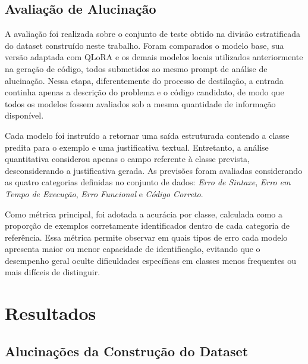 \documentclass[conference]{IEEEtran}
\begin{document}
\subsection{Avaliação de Alucinação}

A avaliação foi realizada sobre o conjunto de teste obtido na divisão estratificada do dataset construído neste trabalho. Foram comparados o modelo base, sua versão adaptada com QLoRA e os demais modelos locais utilizados anteriormente na geração de código, todos submetidos ao mesmo prompt de análise de alucinação. Nessa etapa, diferentemente do processo de destilação, a entrada continha apenas a descrição do problema e o código candidato, de modo que todos os modelos fossem avaliados sob a mesma quantidade de informação disponível.

Cada modelo foi instruído a retornar uma saída estruturada contendo a classe predita para o exemplo e uma justificativa textual. Entretanto, a análise quantitativa considerou apenas o campo referente à classe prevista, desconsiderando a justificativa gerada. As previsões foram avaliadas considerando as quatro categorias definidas no conjunto de dados: \emph{Erro de Sintaxe}, \emph{Erro em Tempo de Execução}, \emph{Erro Funcional} e \emph{Código Correto}.

Como métrica principal, foi adotada a acurácia por classe, calculada como a proporção de exemplos corretamente identificados dentro de cada categoria de referência. Essa métrica permite observar em quais tipos de erro cada modelo apresenta maior ou menor capacidade de identificação, evitando que o desempenho geral oculte dificuldades específicas em classes menos frequentes ou mais difíceis de distinguir.

\section{Resultados}

\subsection{Alucinações da Construção do Dataset}
\end{document}
